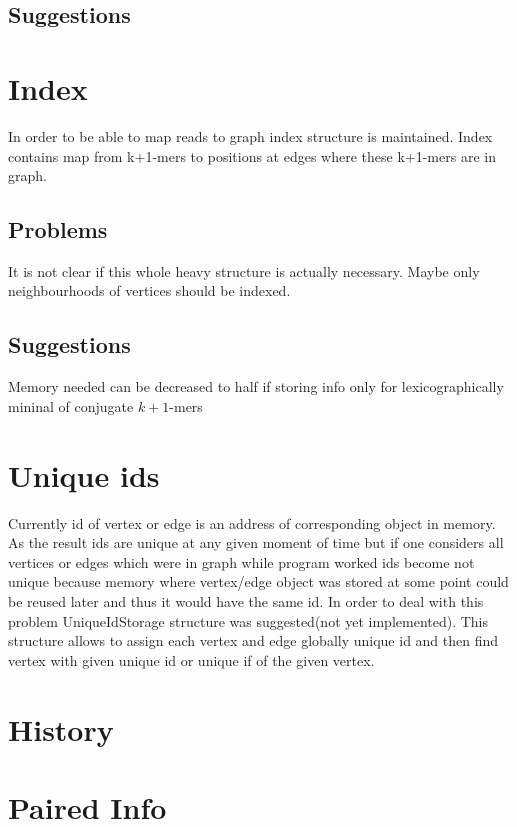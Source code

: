 \documentclass[14pt]{article}
\begin{document}
\subsection{Suggestions}

\section{Index}

In order to be able to map reads to graph index structure is maintained. Index contains map from k+1-mers to positions at edges where these k+1-mers are in graph.

\subsection{Problems}

It is not clear if this whole heavy structure is actually necessary. Maybe only neighbourhoods of vertices should be indexed.


\subsection{Suggestions}
Memory needed can be decreased to half if storing info only for lexicographically mininal of  conjugate $k+1$-mers

\section{Unique ids}

Currently id of vertex or edge is an address of corresponding object in memory. As the result ids are unique at any given moment of time but if one considers all vertices or edges which were in graph while program worked ids become not unique because memory where vertex/edge object was stored at some point could be reused later and thus it would have the same id. In order to deal with this problem UniqueIdStorage structure was suggested(not yet implemented). This structure allows to assign each vertex and edge globally unique id and then find vertex with given unique id or unique if of the given vertex.

\section{History}

\section{Paired Info}
\end{document}
